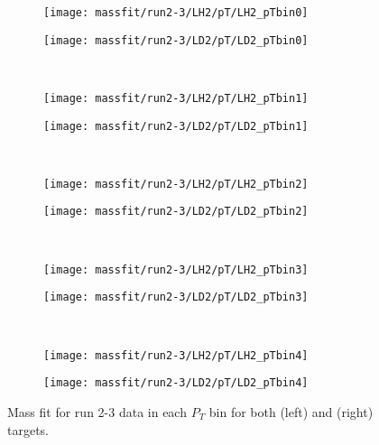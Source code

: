 \documentclass[../main.tex]{subfiles}
\begin{document}
\begin{figure}[h]
	\centering
	\begin{subfigure}{0.4\linewidth}
		\texttt{[image: massfit/run2-3/LH2/pT/LH2\_pTbin0]}
	\end{subfigure}
	\begin{subfigure}{0.4\linewidth}
		\texttt{[image: massfit/run2-3/LD2/pT/LD2\_pTbin0]}
	\end{subfigure}\\
	\begin{subfigure}{0.4\linewidth}
		\texttt{[image: massfit/run2-3/LH2/pT/LH2\_pTbin1]}
	\end{subfigure}
	\begin{subfigure}{0.4\linewidth}
		\texttt{[image: massfit/run2-3/LD2/pT/LD2\_pTbin1]}
	\end{subfigure}\\
	\begin{subfigure}{0.4\linewidth}
		\texttt{[image: massfit/run2-3/LH2/pT/LH2\_pTbin2]}
	\end{subfigure}
	\begin{subfigure}{0.4\linewidth}
		\texttt{[image: massfit/run2-3/LD2/pT/LD2\_pTbin2]}
	\end{subfigure}\\
	\begin{subfigure}{0.4\linewidth}
		\texttt{[image: massfit/run2-3/LH2/pT/LH2\_pTbin3]}
	\end{subfigure}
	\begin{subfigure}{0.4\linewidth}
		\texttt{[image: massfit/run2-3/LD2/pT/LD2\_pTbin3]}
	\end{subfigure}\\
	\begin{subfigure}{0.4\linewidth}
		\texttt{[image: massfit/run2-3/LH2/pT/LH2\_pTbin4]}
	\end{subfigure}
	\begin{subfigure}{0.4\linewidth}
		\texttt{[image: massfit/run2-3/LD2/pT/LD2\_pTbin4]}
	\end{subfigure}
	\caption{Mass fit for run 2-3 data in each $P_T$ bin for both (left) and (right) targets. }
	\label{fig:massfit_57-70_pT}
\end{figure}
\end{document}
